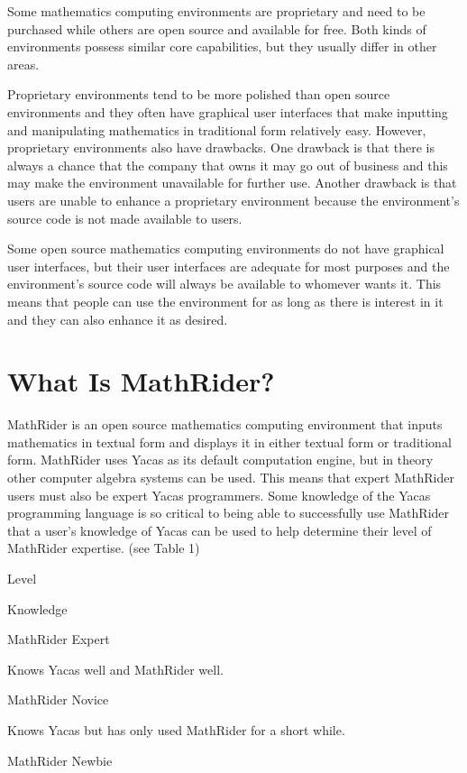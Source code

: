 \documentclass[12pt,oneside]{book}
\begin{document}
Some mathematics computing environments are proprietary and need to be purchased while others are open source and available for free. Both kinds of environments possess similar core capabilities, but they usually differ in other areas. 

Proprietary environments tend to be more polished than open source environments and they often have graphical user interfaces that make inputting and manipulating mathematics in traditional form relatively easy. However, proprietary environments also have drawbacks. One drawback is that there is always a chance that the company that owns it may go out of business and this may make the environment unavailable for further use. Another drawback is that users are unable to enhance a proprietary environment because the environment's source code is not made available to users. 

Some open source mathematics computing environments do not have graphical user interfaces, but their user interfaces are adequate for most purposes and the environment's source code will always be available to whomever wants it. This means that people can use the environment for as long as there is interest in it and they can also enhance it as desired.

\section[What Is MathRider?]{What Is MathRider?}

MathRider is an open source mathematics computing environment that inputs mathematics in textual form and displays it in either textual form or traditional form. MathRider uses Yacas as its default computation engine, but in theory other computer algebra systems can be used. This means that expert MathRider users must also be expert Yacas programmers. Some knowledge of the Yacas programming language is so critical to being able to successfully use MathRider that a user's knowledge of Yacas can be used to help determine their level of MathRider expertise. (see Table 1) 

Level

Knowledge

MathRider Expert

Knows Yacas well and MathRider well.

MathRider Novice

Knows Yacas but has only used MathRider for a short while.

MathRider Newbie
\end{document}
